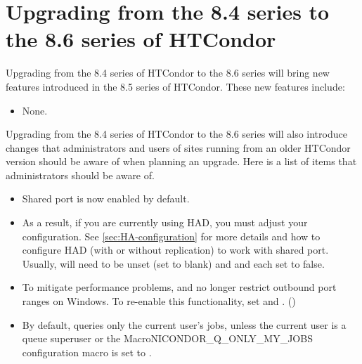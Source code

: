 \section{\label{sec:to-8.6}Upgrading from the 8.4 series to the 8.6 series of HTCondor}

Upgrading from the 8.4 series of HTCondor to the 8.6 series
will bring new features introduced in the 8.5 series of HTCondor.
These new features include:
\begin{itemize}

\item None.

\end{itemize}

Upgrading from the 8.4 series of HTCondor to the 8.6 series will
also introduce changes that administrators and users of sites running from an older
HTCondor version should be aware of when planning an upgrade.
Here is a list of items that administrators should be aware of.

\begin{itemize}

\item Shared port is now enabled by default.

\item As a result, if you are currently using HAD, you must adjust your
configuration.  See \ref{sec:HA-configuration} for more details and how
to configure HAD (with or without replication) to work with shared port.
Usually,  will need to be
unset (set to blank) and  and
 each set to false.

\item To mitigate performance problems,  and
 no longer restrict outbound port ranges on Windows.  To
re-enable this functionality, set  and
.  ()

\item By default,  queries only the current user's jobs,
unless the current user is a queue superuser or the
MacroNI{CONDOR\_Q\_ONLY\_MY\_JOBS} configuration macro is set to
.


\end{itemize}

